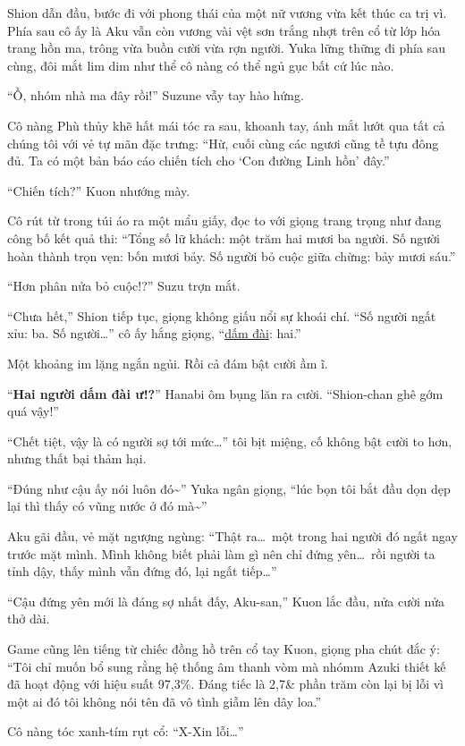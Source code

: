 \documentclass[../main.tex]{subfiles}
\begin{document}
Shion dẫn đầu, bước đi với phong thái của một nữ vương vừa kết thúc ca trị vì. Phía sau cô ấy là Aku vẫn còn vương vài vệt sơn trắng nhợt trên cổ từ lớp hóa trang hồn ma, trông vừa buồn cười vừa rợn người. Yuka lững thững đi phía sau cùng, đôi mắt lim dim như thể cô nàng có thể ngủ gục bất cứ lúc nào.

``Ồ, nhóm nhà ma đây rồi!'' Suzune vẫy tay hào hứng.

Cô nàng Phù thủy khẽ hất mái tóc ra sau, khoanh tay, ánh mắt lướt qua tất cả chúng tôi với vẻ tự mãn đặc trưng: ``Hừ, cuối cùng các ngươi cũng tề tựu đông đủ. Ta có một bản báo cáo chiến tích cho `Con đường Linh hồn' đây.''

``Chiến tích?'' Kuon nhướng mày.

Cô rút từ trong túi áo ra một mẩu giấy, đọc to với giọng trang trọng như đang công bố kết quả thi: ``Tổng số lữ khách: một trăm hai mươi ba người. Số người hoàn thành trọn vẹn: bốn mươi bảy. Số người bỏ cuộc giữa chừng: bảy mươi sáu.''

``Hơn phân nửa bỏ cuộc!?'' Suzu trợn mắt.

``Chưa hết,'' Shion tiếp tục, giọng không giấu nổi sự khoái chí. ``Số người ngất xỉu: ba. Số người\dots'' cô ấy hắng giọng, ``\uline{dấm đài}: hai.''

Một khoảng im lặng ngắn ngủi. Rồi cả đám bật cười ầm ĩ.

``\textbf{Hai người dấm đài ư!?}'' Hanabi ôm bụng lăn ra cười. ``Shion-chan ghê gớm quá vậy!''

``Chết tiệt, vậy là có người sợ tới mức\dots'' tôi bịt miệng, cố không bật cười to hơn, nhưng thất bại thảm hại.

``Đúng như cậu ấy nói luôn đó\~{}'' Yuka ngân giọng, ``lúc bọn tôi bắt đầu dọn dẹp lại thì thấy có vũng nước ở đó mà\~{}''

Aku gãi đầu, vẻ mặt ngượng ngùng: ``Thật ra\dots\ một trong hai người đó ngất ngay trước mặt mình. Mình không biết phải làm gì nên chỉ đứng yên\dots\ rồi người ta tỉnh dậy, thấy mình vẫn đứng đó, lại ngất tiếp\dots''

``Cậu đứng yên mới là đáng sợ nhất đấy, Aku-san,'' Kuon lắc đầu, nửa cười nửa thở dài.

Game cũng lên tiếng từ chiếc đồng hồ trên cổ tay Kuon, giọng pha chút đắc ý: ``Tôi chỉ muốn bổ sung rằng hệ thống âm thanh vòm mà nhómm Azuki thiết kế đã hoạt động với hiệu suất 97,3\%. Đáng tiếc là 2,7\& phần trăm còn lại bị lỗi vì một ai đó tôi không nói tên đã vô tình giẫm lên dây loa.''

Cô nàng tóc xanh-tím rụt cổ: ``X-Xin lỗi\dots''
\end{document}
